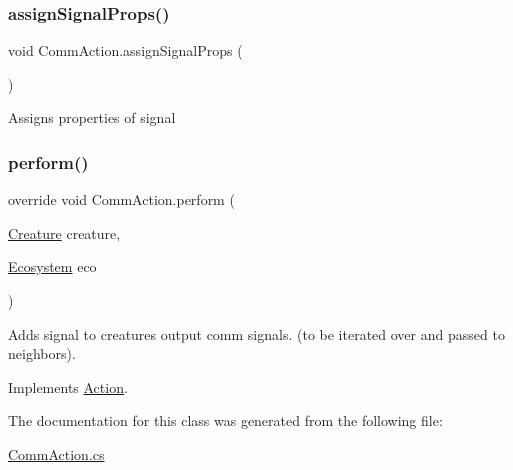 \subsubsection{\texorpdfstring{assign\+Signal\+Props()}{assignSignalProps()}}
{\footnotesize\ttfamily void Comm\+Action.\+assign\+Signal\+Props (\begin{DoxyParamCaption}{ }\end{DoxyParamCaption})}



Assigns properties of signal 

\mbox{\label{class_comm_action_a4ea8e9bcc0a5060221efdc6afefa4355}} 
\subsubsection{\texorpdfstring{perform()}{perform()}}
{\footnotesize\ttfamily override void Comm\+Action.\+perform (\begin{DoxyParamCaption}\item[{\mbox{\hyperlink{class_creature}{Creature}}}]{creature,  }\item[{\mbox{\hyperlink{class_ecosystem}{Ecosystem}}}]{eco }\end{DoxyParamCaption})\hspace{0.3cm}{\ttfamily [virtual]}}



Adds signal to creatures output comm signals. (to be iterated over and passed to neighbors). 



Implements \mbox{\hyperlink{class_action_a2aedfc3be16448fbf224cb13607de3c0}{Action}}.



The documentation for this class was generated from the following file\+:\begin{DoxyCompactItemize}
\item 
\mbox{\hyperlink{_comm_action_8cs}{Comm\+Action.\+cs}}\end{DoxyCompactItemize}
